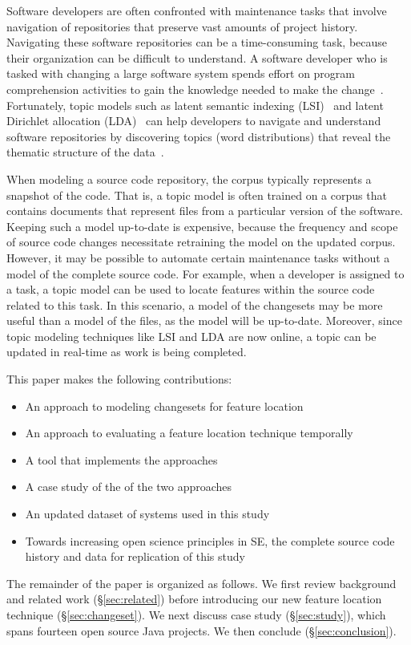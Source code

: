 %

Software developers are often confronted with maintenance tasks that involve navigation of repositories that preserve vast amounts of project history.
Navigating these software repositories can be a time-consuming task, because their organization can be difficult to understand.
A software developer who is tasked with changing a large software system spends effort on program comprehension activities to gain the knowledge needed to make the change~\cite{Corbi:1989}.
Fortunately, topic models such as
latent semantic indexing (LSI)~\cite{Deerwester:1990} and
latent Dirichlet allocation (LDA)~\cite{Blei-etal:2003}
can help developers to navigate and understand software repositories
by discovering topics (word distributions) that reveal the thematic structure of the data~\cite{Linstead-etal:2007,Thomas-etal:2011,Hindle_etal:2012}.


When modeling a source code repository, the corpus typically represents a snapshot of the code.
That is, a topic model is often trained on a corpus that contains documents that represent files from a particular version of the software.
Keeping such a model up-to-date is expensive, because the frequency and scope of source code changes necessitate retraining the model on the updated corpus.
However, it may be possible to automate certain maintenance tasks without a model of the complete source code.
For example, when a developer is assigned to a task, a topic model can be used to locate features within the source code related to this task.
In this scenario, a model of the changesets may be more useful than a model of the files, as the model will be up-to-date.
Moreover, since topic modeling techniques like LSI and LDA are now online, a topic can be updated in real-time as work is being completed.

This paper makes the following contributions:

\begin{itemize}
    \item An approach to modeling changesets for feature location
    \item An approach to evaluating a feature location technique temporally
    \item A tool that implements the approaches
    \item A case study of the of the two approaches
    \item An updated dataset of systems used in this study
    \item Towards increasing open science principles in SE,
        the complete source code history and data for replication of this study
\end{itemize}

The remainder of the paper is organized as follows.
We first review background and related work (\S\ref{sec:related})
before introducing our new feature location technique (\S\ref{sec:changeset}).
We next discuss case study (\S\ref{sec:study}), which spans fourteen open source Java projects. %
We then conclude (\S\ref{sec:conclusion}).
